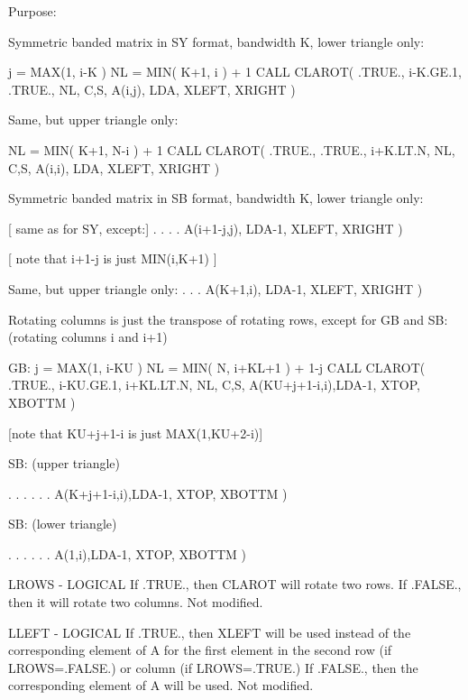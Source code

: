 \begin{DoxyParagraph}{Purpose\+: }
\begin{DoxyVerb}

      Symmetric banded matrix in SY format, bandwidth K,
      lower triangle only:

              j = MAX(1, i-K )
              NL = MIN( K+1, i ) + 1
              CALL CLAROT( .TRUE., i-K.GE.1, .TRUE., NL, C,S,
                      A(i,j), LDA, XLEFT, XRIGHT )

      Same, but upper triangle only:

              NL = MIN( K+1, N-i ) + 1
              CALL CLAROT( .TRUE., .TRUE., i+K.LT.N, NL, C,S,
                      A(i,i), LDA, XLEFT, XRIGHT )

      Symmetric banded matrix in SB format, bandwidth K,
      lower triangle only:

              [ same as for SY, except:]
                  . . . .
                      A(i+1-j,j), LDA-1, XLEFT, XRIGHT )

              [ note that i+1-j is just MIN(i,K+1) ]

      Same, but upper triangle only:
                  . . .
                      A(K+1,i), LDA-1, XLEFT, XRIGHT )

      Rotating columns is just the transpose of rotating rows, except
      for GB and SB: (rotating columns i and i+1)

      GB:
              j = MAX(1, i-KU )
              NL = MIN( N, i+KL+1 ) + 1-j
              CALL CLAROT( .TRUE., i-KU.GE.1, i+KL.LT.N, NL, C,S,
                      A(KU+j+1-i,i),LDA-1, XTOP, XBOTTM )

              [note that KU+j+1-i is just MAX(1,KU+2-i)]

      SB: (upper triangle)

                   . . . . . .
                      A(K+j+1-i,i),LDA-1, XTOP, XBOTTM )

      SB: (lower triangle)

                   . . . . . .
                      A(1,i),LDA-1, XTOP, XBOTTM )\end{DoxyVerb}
 \begin{DoxyVerb}  LROWS  - LOGICAL
           If .TRUE., then CLAROT will rotate two rows.  If .FALSE.,
           then it will rotate two columns.
           Not modified.

  LLEFT  - LOGICAL
           If .TRUE., then XLEFT will be used instead of the
           corresponding element of A for the first element in the
           second row (if LROWS=.FALSE.) or column (if LROWS=.TRUE.)
           If .FALSE., then the corresponding element of A will be
           used.
           Not modified.


\end{DoxyVerb}
\end{DoxyParagraph}
